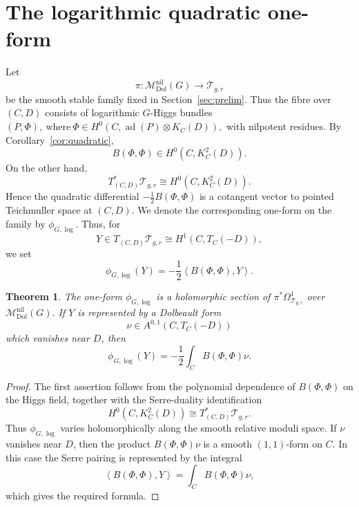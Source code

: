 \documentclass[10pt,a4paper]{amsart}
\numberwithin{equation}{section}
\newtheorem{theorem}{Theorem}[section]
\begin{document}
\section{The logarithmic quadratic one-form}
\label{sec:logoneform}

Let
\[
        \pi:\mathcal M^{\mathrm{nil}}_{\mathrm{Dol}}(G)
        \longrightarrow
        \mathcal T_{g,r}
\]
be the smooth stable family fixed in Section~\ref{sec:prelim}. Thus the fibre
over \((C,D)\) consists of logarithmic \(G\)-Higgs bundles
\(
        (P,\Phi),
        \ \text{where} \
        \Phi\in H^0(C,\operatorname{ad}(P)\otimes K_C(D)),
\)
with nilpotent residues. By Corollary~\ref{cor:quadratic},
\[
        B(\Phi,\Phi)\in H^0(C,K_C^2(D)).
\]
On the other hand,
\[
        T^*_{(C,D)}\mathcal T_{g,r}
        \cong
        H^0(C,K_C^2(D)).
\]
Hence the quadratic differential
\(
        -\frac12B(\Phi,\Phi)
\)
is a cotangent vector to pointed Teichmuller space at \((C,D)\).  We denote the
corresponding one-form on the family by
\(
        \phi_{G,\log}.
\)
Thus, for
\[
        Y\in T_{(C,D)}\mathcal T_{g,r}
        \cong H^1(C,T_C(-D)),
\]
we set
\[
        \phi_{G,\log}(Y)
        =
        -\frac12
        \left\langle B(\Phi,\Phi),Y\right\rangle .
\]


\begin{theorem}
\label{thm:log-oneform}
The one-form
\(
        \phi_{G,\log}
\)
is a holomorphic section of
\(
        \pi^*\Omega^1_{\mathcal T_{g,r}}
\)
over
\(
        \mathcal M^{\mathrm{nil}}_{\mathrm{Dol}}(G).
\)
If \(Y\) is represented by a Dolbeault form
\[
        \nu\in A^{0,1}(C,T_C(-D))
\]
which vanishes near \(D\), then
\[
        \phi_{G,\log}(Y)
        =
        -\frac12\int_C B(\Phi,\Phi)\nu .
\]
\end{theorem}

\begin{proof}
The first assertion follows from the polynomial dependence of
\(
        B(\Phi,\Phi)
\)
on the Higgs field, together with the Serre-duality identification
\[
        H^0(C,K_C^2(D))
        \cong
        T^*_{(C,D)}\mathcal T_{g,r}.
\]
Thus \(\phi_{G,\log}\) varies holomorphically along the smooth relative moduli
space. If \(\nu\) vanishes near \(D\), then the product \(B(\Phi,\Phi)\nu\) is a smooth
\((1,1)\)-form on \(C\).  In this case the Serre pairing is represented by the integral
\[
        \left\langle B(\Phi,\Phi),Y\right\rangle
        =
        \int_C B(\Phi,\Phi)\nu,
\]
which gives the required formula.
\end{proof}
\end{document}
